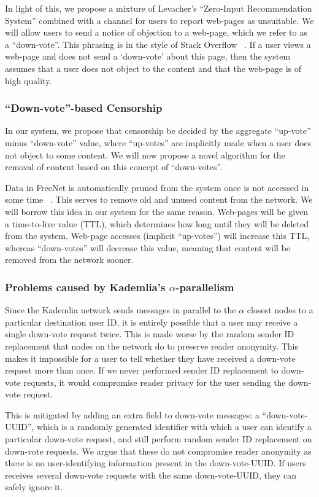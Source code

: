 In light of this, we propose a mixture of Levacher's ``Zero-Input Recommendation System'' combined with a channel for users to
report web-pages as unsuitable.
We will allow users to send a notice of objection to a web-page, which we refer to as a ``down-vote''. This phrasing is in the
style of Stack Overflow ~\cite{stackoverflow}. If a user views a web-page and does not send a `down-vote' about this page, then the
system assumes that a user does not object to the content and that the web-page is of high quality.

\subsubsection{``Down-vote''-based Censorship}

In our system, we propose that censorship be decided by the aggregate ``up-vote'' minus ``down-vote'' value,
where ``up-votes'' are implicitly made when a user does not object to some content.
We will now propose a novel algorithm for the removal of content based on this concept of ``down-votes''.

Data in FreeNet is automatically pruned from the system once is not accessed in some time ~\cite{freenet}.
This serves to remove old and unused content from the network. We will borrow this idea in our system for
the same reason. Web-pages will be given a time-to-live value (TTL), which determines how long until they will
be deleted from the system. Web-page accesses (implicit ``up-votes'') will increase this
TTL, whereas ``down-votes'' will decrease this value, meaning that content will be removed from the network sooner.

\subsubsection{Problems caused by Kademlia's $\alpha$-parallelism}

Since the Kademlia network sends messages in parallel to the $\alpha$ closest nodes to a particular destination user ID,
it is entirely possible that a user may receive a single down-vote request twice. This is made worse by the
random sender ID replacement that nodes on the network do to preserve reader anonymity.
This makes it impossible for a user to tell whether they have received a down-vote request more than once.
If we never performed sender ID replacement to down-vote requests, it would compromise reader privacy for the user
sending the down-vote request.

This is mitigated by adding an extra field to down-vote messages: a ``down-vote-UUID'', which is a randomly generated
identifier with which a user can identify a particular down-vote request, and still perform random sender ID
replacement on down-vote requests. We argue that these do not compromise reader anonymity as there is no
user-identifying information present in the down-vote-UUID. If users receives several down-vote requests
with the same down-vote-UUID, they can safely ignore it.

